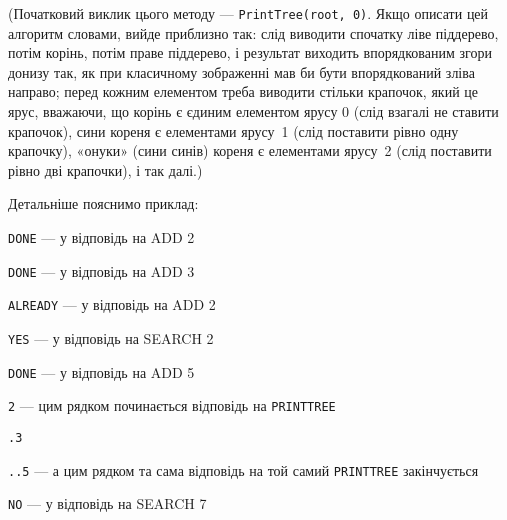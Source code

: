 (Початковий виклик цього методу --- {\tt PrintTree(root,~0)}. Якщо описати цей алгоритм словами, вийде приблизно так: слід виводити спочатку ліве піддерево, потім корінь, потім праве піддерево, і результат виходить впорядкованим згори донизу так, як при класичному зображенні мав би бути впорядкований зліва направо; перед кожним елементом треба виводити стільки крапочок, який це ярус, вважаючи, що корінь є єдиним елементом ярусу 0 (слід взагалі не ставити крапочок), сини кореня є елементами ярусу~1 (слід поставити рівно одну крапочку), «онуки» (сини синів) кореня є елементами ярусу~2 (слід поставити рівно дві крапочки), і так далі.) 

\Examples

\begin{example}
\end{example}

\Note
Детальніше пояснимо приклад:

{\tt DONE} --- у відповідь на ADD 2

{\tt DONE} --- у відповідь на ADD 3

{\tt ALREADY} --- у відповідь на ADD 2

{\tt YES} --- у відповідь на SEARCH 2

{\tt DONE} --- у відповідь на ADD 5

{\tt 2} --- цим рядком починається відповідь на {\tt PRINTTREE}

{\tt .3}

{\tt ..5} --- а цим рядком та сама відповідь на той самий {\tt PRINTTREE} закінчується

{\tt NO} --- у відповідь на SEARCH 7
